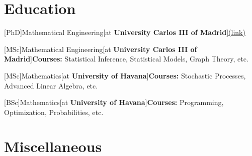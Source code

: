\documentclass[a4paper]{arthur-cv}
\begin{document}
\begin{textblock}{20.5}
\begin{minipage}[t]{0.61\textwidth}

    \section{Education}
      \begin{rightenv}
        [PhD]{Mathematical Engineering}[at \textbf{University Carlos III of Madrid}]{\href{https://www.uc3m.es/phdprogram/mathematical-engineering}{(link)}}

        [MSc]{Mathematical Engineering}[at \textbf{University Carlos III of Madrid}]{\textbf{Courses:} Statistical Inference, Statistical Models, Graph Theory, etc.}
        
        [MSc]{Mathematics}[at \textbf{University of Havana}]{\textbf{Courses:} Stochastic Processes, Advanced Linear Algebra, etc.}

        [BSc]{Mathematics}[at \textbf{University of Havana}]{\textbf{Courses:} Programming, Optimization, Probabilities, etc.}
      \end{rightenv}

    \section{Miscellaneous}
      \begin{rightenv}



      \end{rightenv}

  \end{minipage}

\end{textblock}
\end{document}
